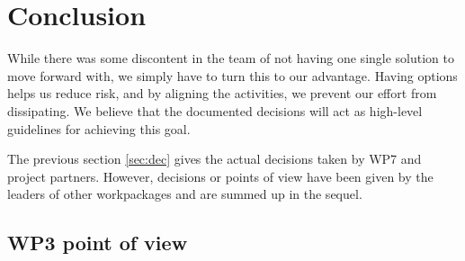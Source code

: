\begin{comment}
Issue \#79 openned by Uwe Steinke to discuss here :


WP 7 is in the obligation to provide and supply all other WPs with an intermediate tool chain until the preferred tool chain becomes operabel. The reason is to enable the other WPs to work productivly.
Additionally, there must be a migration path between the intermediate tool chain and the preferred one, that assures that the results produced with the intermediate tools can be transferred automatically.

The intermediate path has to be specified in this document.

\end{comment}

\begin{comment}
Issue \#99 openned by Christophe Ponsard :


I like the point about interfaces enabling to "cross-over" between toolchains

In figure 2 we could highlight them more explicitly, obviously after semi-formal (common papyrus) but also at the interface with code generation.

(maybe the figure is not suited to show them all)

\end{comment}

\section{Conclusion}

While there was some discontent in the team of not having one single solution to move forward with, we simply have to turn this to our advantage.  Having options helps us reduce risk, and by aligning the activities, we prevent our effort from dissipating.  We believe that the documented decisions will act as high-level guidelines for achieving this goal.

The previous section \ref{sec:dec} gives the actual decisions taken by WP7 and project partners.
However, decisions or points of view have been given by the leaders of other workpackages and are summed up in the sequel.

\subsection{WP3 point of view}

